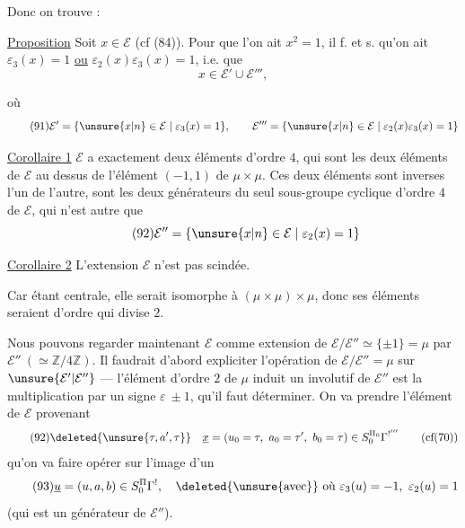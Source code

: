 Donc on trouve :

\uline{Proposition} Soit $x\in\mathcal E$ (cf (84)). Pour que
l'on ait $x^2=1$, il f. et s. qu'on ait
$\varepsilon_3(x)=1$ \uline{ou} $\varepsilon_2(x)\varepsilon_3(x)=1$,
i.e. que
\[
\tag{90}
x\in\mathcal E'\cup\mathcal E''',
\]



où
\[
\tag{91}
\mathcal E'=\{\unsure{x|n}\in\mathcal E\mid\varepsilon_3(x)=1\},\qquad
\mathcal E'''=\{\unsure{x|n}\in\mathcal E\mid\varepsilon_2(x)\varepsilon_3(x)=1\}
\]

\uline{Corollaire 1} $\mathcal E$ a exactement deux éléments
d'ordre $4$, qui sont les deux éléments de $\mathcal E$ au
dessus de l'élément $(-1,1)$ de $\mu\times\mu$.
Ces deux éléments sont inverses l'un de
l'autre,  sont les deux générateurs du
seul sous-groupe cyclique d'ordre $4$ de $\mathcal E$,
qui n'est autre que
\[
\tag{92}
\mathcal E''=\{\unsure{x|n}\in\mathcal E\mid\varepsilon_2(x)=1\}
\]

\uline{Corollaire 2} L'extension $\mathcal E$ n'est pas scindée.

Car étant centrale, elle  serait isomorphe
à $(\mu\times\mu)\times\mu$, donc ses éléments seraient d'ordre
qui divise $2$.

Nous pouvons regarder maintenant
$\mathcal E$ comme extension de $\mathcal E/\mathcal E''\simeq\{\pm1\}=\mu$ par
$\mathcal E''\ (\simeq\mathbb Z/4\mathbb Z)$.
 Il faudrait
d'abord expliciter l'opération de $\mathcal E/\mathcal E''=\mu$
sur $\unsure{\mathcal E'|\mathcal E''}$ --- l'élément  d'ordre $2$ de $\mu$
induit un  involutif de  $\mathcal E''$
 est la multiplication par un
signe $\varepsilon\ \pm1$, qu'il faut déterminer. On va
prendre 
l'élément de $\mathcal E$ provenant
\[
\tag{92}
\deleted{\unsure{\tau,a',\tau}}\quad
\underline x=(u_0=\tau,\ a_0=\tau',\ b_0=\tau)
\in S_0^{\Pi_0}\Gamma^{!'''}\qquad(\text{cf}(70))
\]
qu'on va faire opérer sur l'image d'un
\[
\tag{93}
\underline u=(u,a,b)\in S_0^{\Pi}\Gamma^{!},\quad
\deleted{\unsure{\text{avec}}}\ \text{où }\varepsilon_3(u)=-1,\ \varepsilon_2(u)=1
\]
(qui est un générateur de $\mathcal E''$).

